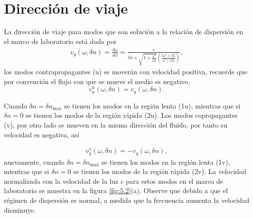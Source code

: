 \section{Direcci\'{o}n de viaje}\label{dirviaje}
La direcci\'{o}n de viaje para modos que son soluci\'{o}n a la relaci\'{o}n de dispersi\'{o}n en el marco de laboratorio est\'{a} dada por
\begin{align}
v_g(\omega,\delta n)=\frac{\partial\omega}{\partial \beta}=\frac{c}{\delta n+\displaystyle \sqrt{1+\frac{\omega^2}{\Omega_0^2}}\left(\frac{2\omega^2+\Omega_0^2}{\omega^2+\Omega_0^2}\right)},
\end{align}
los modos contrapropagantes (u) se mover\'{a}n con velocidad positiva, recuerde que por convenci\'{o}n el flujo con que se mueve el medio es negativo,
\begin{equation}
v_g^{\text{u}}(\omega,\delta n)=v_g(\omega,\delta n).
\end{equation}

Cuando $\delta n=\delta n_{\text{max}}$ se tienen los modos en la regi\'{o}n lenta (1u), mientras que si $\delta n=0$ se tienen los modos de la regi\'{o}n r\'{a}pida (2u). Los modos copropagantes (v), por otro lado se mueven en la misma direcci\'{o}n del fluido, por tanto su velocidad es negativa, as\'{i}

\begin{align}
v_{g}^{\text{v}}(\omega,\delta n)=-v_g(\omega,\delta n),
\end{align}
nuevamente, cuando $\delta n=\delta n_{\text{max}}$ se tienen los modos en la regi\'{o}n lenta (1v), mientras que si $\delta n=0$ se tienen los modos de la regi\'{o}n r\'{a}pida (2v). La velocidad normalizada con la velocidad de la luz $c$ para estos modos en el marco de laboratorio se muestra en la figura \ref{fig:5.2}(a). Observe que debido a que el r\'{e}gimen de dispersi\'{o}n es normal, a medida que la frecuencia aumenta la velocidad disminuye.\\


